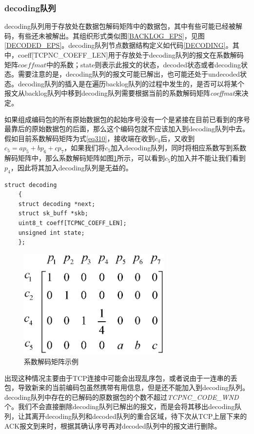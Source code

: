 \subsubsection{\textbf{decoding队列}}
decoding队列用于存放处在数据包解码矩阵中的数据包，其中有些可能已经被解码，有些还未被解出。其组织形式类似图\ref{BACKLOG_EPS}，见图\ref{DECODED_EPS}。decoding队列节点数据结构定义如代码\ref{DECODING}。其中，coeff[TCPNC\_COEFF\_LEN]用于存放处于decoding队列的报文在系数解码矩阵$coeffmat$中的系数；state则表示此报文的状态，decoded状态或者decoding状态。需要注意的是，decoding队列的报文可能已解出，也可能还处于undecoded状态。decoding队列的插入是在遍历backlog队列的过程中发生的，是否可以将某个报文从backlog队列中移到decoding队列需要根据当前的系数解码矩阵\emph{coeffmat}来决定。
\par
如果组成编码包的所有原始数据包的起始序号没有一个是紧接在目前已看到的序号最靠后的原始数据包的后面，那么这个编码包就不应该加入到decoding队列中去。假如目前系数解码矩阵为式\ref{eq310}，接收端在收到$c_4$后，又收到$c_5=ap_{5}+bp_{6}+cp_{7}$，如果我们将$c_5$加入decoding队列，同时将相应系数写到系数解码矩阵中，那么系数解码矩阵如图\ref{IFADD_EPS}所示，可以看到$c_5$的加入并不能让我们看到$p_{4}$，因此将其加入decoding队列是无益的。
	\begin{lstlisting}[float,caption=decoding链表节点数据结构,label={DECODING},language={[ANSI]C}]
	struct decoding
	{
	struct decoding *next;
	struct sk_buff *skb;		
	uint8_t coeff[TCPNC_COEFF_LEN];
	unsigned int state;
	};
	\end{lstlisting}
\begin{figure}[htbp]
	\centering
	\includegraphics[width=3in]{figures/ifadd.eps}
	\caption{系数解码矩阵示例}
	\label{IFADD_EPS}
\end{figure}
出现这种情况主要由于TCP连接中可能会出现乱序包，或者说由于一连串的丢包，导致新来的当前编码包虽然携带有用信息，但是还不能加入到decoding队列。decoding队列中存在的已解码的原数据包的个数不超过\emph{TCPNC\_CODE\_WND}个。我们不会直接删除decoding队列已解出的报文，而是会将其移出decoding队列，让其离开decoding队列和decoded队列的重合区域，待下次从TCP上层下来的ACK报文到来时，根据其确认序号再对decoded队列中的报文进行删除。
